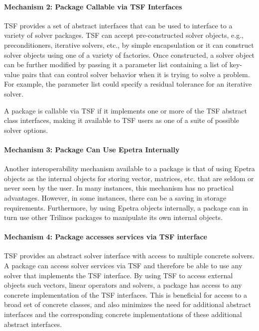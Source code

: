 \documentclass[acmtoms,acmnow]{acmtrans2m}
\begin{document}
\paragraph*{Mechanism 2: Package Callable via TSF Interfaces}
TSF provides a set of abstract interfaces that can be used to
interface to a variety of solver packages.  TSF can accept
pre-constructed solver objects, e.g., preconditioners, iterative
solvers, etc., by simple encapsulation or it can
construct solver objects using one of a variety of factories.  Once
constructed, a solver object can be further modified by passing it a
parameter list containing a list of key-value pairs that can control
solver behavior when it is trying to solve a problem.  For example,
the parameter list could specify a residual tolerance for an iterative solver.

A package is callable via TSF if it implements one or more of the TSF
abstract class interfaces, making it available to TSF users as one of a
suite of possible solver options.

\paragraph*{Mechanism 3: Package Can Use Epetra Internally}

Another interoperability mechanism available to a package is that of
using Epetra objects as the
internal objects for storing vector, matrices, etc. that are seldom or
never seen by the user.  In many instances, this mechanism has no
practical advantages.  However, in some instances, there can be a
saving in storage requirements.  Furthermore, by using Epetra objects
internally, a package can in turn use other Trilinos packages to
manipulate its own internal objects.

\paragraph*{Mechanism 4: Package accesses services via TSF interface}
TSF provides an abstract solver interface with access to multiple concrete 
solvers. 
A package can access solver services via TSF and therefore be able to use
any solver that implements the TSF interface.  By using TSF to access
external objects such vectors, linear operators and solvers, a package
has access to any concrete implementation of the TSF interfaces.  This
is beneficial for access to a broad set of concrete classes, and also
minimizes the need for additional abstract interfaces and the
corresponding concrete implementations of these additional abstract interfaces.
\end{document}
